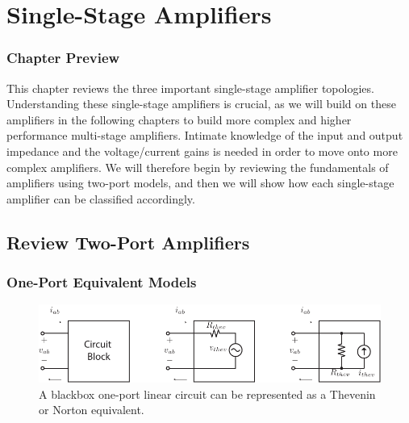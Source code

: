 





\chapter{Single-Stage Amplifiers}


\graphicspath{{./figs_amps_single_stage/}}





\subsection{Chapter Preview}


This chapter reviews the three important single-stage amplifier topologies.  Understanding these single-stage amplifiers is crucial, as we will build on these amplifiers in the following chapters to build more complex and higher performance multi-stage amplifiers.  Intimate knowledge of the input and output impedance and the voltage/current gains is needed in order to move onto more complex amplifiers.  We will therefore begin by reviewing the fundamentals of amplifiers using two-port models, and then we will show how each single-stage amplifier can be classified accordingly.  



\section{Review Two-Port Amplifiers}


\subsection{One-Port Equivalent Models}

\begin{figure}[tb]
\begin{center}
\includegraphics[scale=1]{oneports}
\end{center}
\caption{A blackbox one-port linear circuit can be represented as a Thevenin or Norton equivalent.} \label{fig:oneports}
\end{figure}

